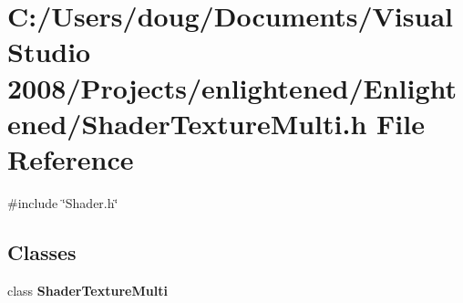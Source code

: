 \section{C:/Users/doug/Documents/Visual Studio 2008/Projects/enlightened/Enlightened/ShaderTextureMulti.h File Reference}
\label{_shader_texture_multi_8h}
{\ttfamily \#include \char`\"{}Shader.h\char`\"{}}\par
\subsection*{Classes}
\begin{DoxyCompactItemize}
\item 
class {\bf ShaderTextureMulti}
\end{DoxyCompactItemize}
